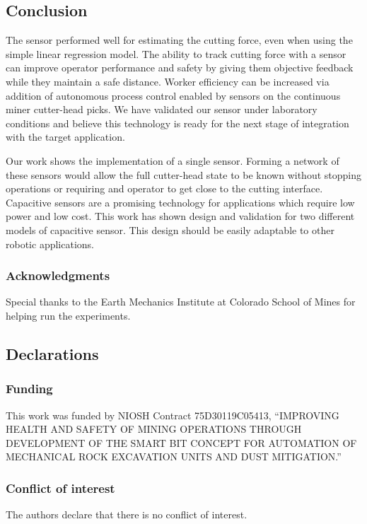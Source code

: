 \subsection{Conclusion}\label{sec13}

The sensor performed well for estimating the cutting force, even when using the simple linear regression model.
The ability to track cutting force with a sensor can improve operator performance and safety by giving them
objective feedback while they maintain a safe distance. 
Worker efficiency can be increased via addition of 
autonomous process control enabled by sensors on the continuous miner cutter-head picks.
We have validated our sensor under laboratory conditions and believe this technology is ready
for the next stage of integration with the target application.

Our work shows the implementation of a single sensor.
Forming a network of these sensors would allow the full 
cutter-head state to be known without stopping operations
or requiring and operator to get close to the cutting interface.
Capacitive sensors are a promising technology for applications which 
require low power and low cost.
This work has shown design and validation for two different models of capacitive sensor. 
This design should be easily adaptable to other robotic applications.

\subsubsection{Acknowledgments}
Special thanks to the Earth Mechanics Institute at
Colorado School of Mines for helping run the experiments.

\subsection*{Declarations}

\subsubsection*{Funding}
This work was funded by NIOSH Contract
75D30119C05413, “IMPROVING HEALTH AND SAFETY OF
MINING OPERATIONS THROUGH DEVELOPMENT OF THE
SMART BIT CONCEPT FOR AUTOMATION OF MECHANICAL
ROCK EXCAVATION UNITS AND DUST MITIGATION.”

\subsubsection*{Conflict of interest}
The authors declare that there is no conflict of interest.

